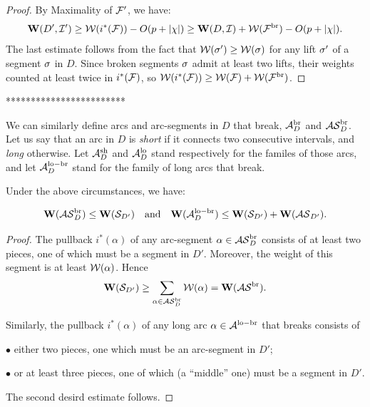 {{\begin{proof}
  By Maximality of ${\mathcal F}'$, we have:
$$
   {\mathbf{W}}(D', {\mathcal I}') \geq {\mathcal W}( i^*({\mathcal F}) ) - O(p+|\chi|) \geq {\mathbf{W}} (D, {\mathcal I})
   + {\mathcal W}({\mathcal F}^{\mathrm{br}})
   - O(p+|\chi|).
$$
The last estimate follows from the fact that    ${\mathcal W}({\sigma}') \geq {\mathcal W}({\sigma})$
for any lift $ {\sigma}' $ of  a segment ${\sigma}$ in $D$. Since
broken segments ${\sigma}$ admit at least two lifts, their weights counted
at least twice in $i^* ({\mathcal F})$, so
$ {\mathcal W}(i^*({\mathcal F})) \geq {\mathcal W}({\mathcal F})+{\mathcal W}({\mathcal F}^{\mathrm{br}})$.  
\end{proof}
************************} 

We can similarly define arcs and arc-segments in $D$ that break,
${\mathcal A}_D^{\mathrm{br}}$ and ${\mathcal{AS}}_D^{\mathrm{br}}$.
Let us say that an arc in $D$  is {\em short} if it connects 
 two consecutive intervals, and {\em long} otherwise.
 Let ${\mathcal A}_D^{\mathrm{sh}}$ and ${\mathcal A}_D^{\mathrm{lo}}$ stand respectively for the
 familes of those arcs, and let ${\mathcal A}_D^{\mathrm{lo-br}}$ stand for the
 family of long arcs that break.


 \begin{lem}\label{broken arc-segments} 
   Under the above circumstances, we have:

$$
{\mathbf{W}}({\mathcal{AS}}_D^{\mathrm{br}}) \leq {\mathbf{W}} ({\mathcal S}_{D'} ) \quad {\mathrm {and}} \quad
{\mathbf{W}}({\mathcal A}_D^{\mathrm{lo-br}}) \leq {\mathbf{W}} ({\mathcal S}_{D'} ) + {\mathbf{W}} ({\mathcal{AS}}_{D'} )  .
$$
   
 \end{lem}

 \begin{proof}
The pullback $i^*(\alpha) $ of any arc-segment  $\alpha\in {\mathcal{AS}}_D^{\mathrm{br}}$
 consists of at least two pieces, one of which must be a
 segment in $D'$. Moreover, the weight of this segment is at least
 ${\mathcal W}(\alpha)$. Hence
 $$
 {\mathbf{W}}({\mathcal S}_{D'} ) 
 \geq \sum_{\alpha\in {\mathcal{AS}}_D^{\mathrm{br}}} {\mathcal W} (\alpha) = {\mathbf{W}}({\mathcal{AS}}^{\mathrm{br}}).  
 $$

 \ssk 
Similarly,    the pullback $i^*(\alpha)$  of any  long arc
$\alpha\in {\mathcal A}^{\mathrm{lo-br}} $ that breaks consists of

\ssk\nin $\bullet$ either two pieces, one which must be an arc-segment
in $D'$;

\ssk\nin $\bullet$
or at least three pieces, one of which (a ``middle'' one)  must be a
segment in $D'$.

\ssk The second desird estimate follows. 
\end{proof}   
 
 
\comm{****** 

}}
